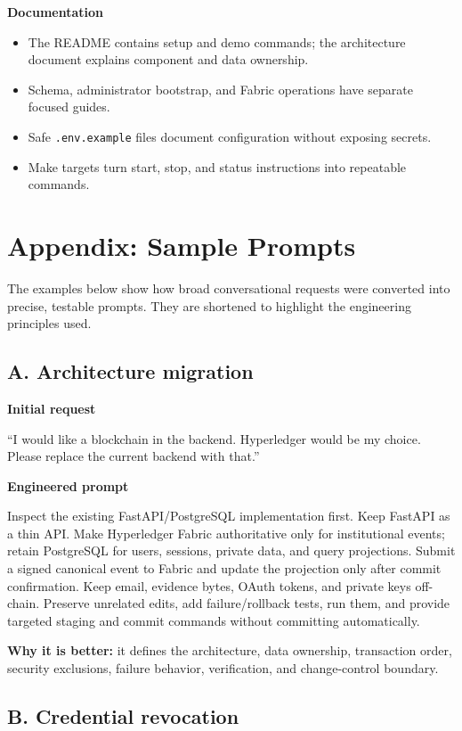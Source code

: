 \documentclass[10pt,a4paper]{article}
\newcommand{\callout}[1]{%
  \vspace{2pt}\noindent
  \colorbox{soft}{\parbox{0.965\linewidth}{\small #1}}\vspace{2pt}}
\begin{document}
\textbf{Documentation}
\begin{itemize}
  \item The README contains setup and demo commands; the architecture document explains component and data ownership.
  \item Schema, administrator bootstrap, and Fabric operations have separate focused guides.
  \item Safe \texttt{.env.example} files document configuration without exposing secrets.
  \item Make targets turn start, stop, and status instructions into repeatable commands.
\end{itemize}

\newpage
\section{Appendix: Sample Prompts}

The examples below show how broad conversational requests were converted into precise, testable prompts. They are shortened to highlight the engineering principles used.

\subsection{A. Architecture migration}

\textbf{Initial request}\par
\callout{``I would like a blockchain in the backend. Hyperledger would be my choice. Please replace the current backend with that.''}

\textbf{Engineered prompt}\par
\callout{Inspect the existing FastAPI/PostgreSQL implementation first. Keep FastAPI as a thin API. Make Hyperledger Fabric authoritative only for institutional events; retain PostgreSQL for users, sessions, private data, and query projections. Submit a signed canonical event to Fabric and update the projection only after commit confirmation. Keep email, evidence bytes, OAuth tokens, and private keys off-chain. Preserve unrelated edits, add failure/rollback tests, run them, and provide targeted staging and commit commands without committing automatically.}

\textbf{Why it is better:} it defines the architecture, data ownership, transaction order, security exclusions, failure behavior, verification, and change-control boundary.

\subsection{B. Credential revocation}
\end{document}
